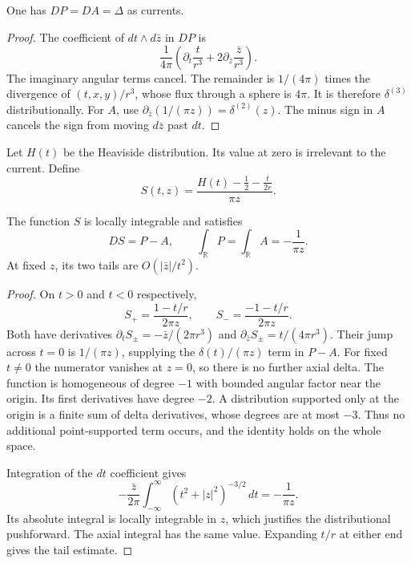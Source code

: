 \begin{lemma}\label{lem:vol2-kernel-source}
One has $DP=DA=\Delta$ as currents.
\end{lemma}

\begin{proof}
The coefficient of $dt\wedge d\bar z$ in $DP$ is
\[
 \frac1{4\pi}\left(\partial_t\frac{t}{r^3}
               +2\partial_{\bar z}\frac{\bar z}{r^3}\right).
\]
The imaginary angular terms cancel. The remainder is $1/(4\pi)$
times the divergence of $(t,x,y)/r^3$, whose flux through a sphere
is $4\pi$. It is therefore $\delta^{(3)}$ distributionally.
For $A$, use $\partial_{\bar z}(1/(\pi z))=\delta^{(2)}(z)$.
The minus sign in $A$ cancels the sign from moving $d\bar z$
past $dt$.
\end{proof}

Let $H(t)$ be the Heaviside distribution. Its value at zero is
irrelevant to the current. Define
\begin{equation}\label{eq:vol2-kernel-primitive}
 S(t,z)=\frac{H(t)-\tfrac12-\tfrac{t}{2r}}{\pi z}.
\end{equation}

\begin{proposition}\label{prop:vol2-kernel-primitive}
The function $S$ is locally integrable and satisfies
\[
 DS=P-A,\qquad
 \int_{\mathbb R}P=\int_{\mathbb R}A=-\frac1{\pi z}.
\]
At fixed $z$, its two tails are $O(|\bar z|/t^2)$.
\end{proposition}

\begin{proof}
On $t>0$ and $t<0$ respectively,
\[
 S_+=\frac{1-t/r}{2\pi z},\qquad
 S_-=\frac{-1-t/r}{2\pi z}.
\]
Both have derivatives
$\partial_tS_\pm=-\bar z/(2\pi r^3)$ and
$\partial_{\bar z}S_\pm=t/(4\pi r^3)$.
Their jump across $t=0$ is $1/(\pi z)$, supplying the
$\delta(t)/(\pi z)$ term in $P-A$. For fixed $t\ne0$ the
numerator vanishes at $z=0$, so there is no further axial delta.
The function is homogeneous of degree $-1$ with bounded angular
factor near the origin. Its first derivatives have degree $-2$.
A distribution supported only at the origin is a finite sum of
delta derivatives, whose degrees are at most $-3$. Thus no
additional point-supported term occurs, and the identity holds
on the whole space.

Integration of the $dt$ coefficient gives
\[
 -\frac{\bar z}{2\pi}\int_{-\infty}^{\infty}
          (t^2+|z|^2)^{-3/2}\,dt=-\frac1{\pi z}.
\]
Its absolute integral is locally integrable in $z$, which justifies
the distributional pushforward. The axial integral has the same
value. Expanding $t/r$ at either end gives the tail estimate.
\end{proof}

